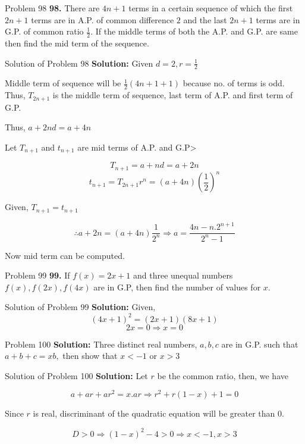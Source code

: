 \documentclass[aspectratio=1610,8pt]{beamer}
\begin{document}
\begin{frame}{Problem 98}
  \textbf{98.} There are $4n + 1$ terms in a certain sequence of which the first $2n + 1$ terms are in A.P. of common difference
  $2$ and the last $2n + 1$ terms are in G.P. of common ratio $\frac{1}{2}.$ If the middle terms of both the A.P. and G.P. are same
  then find the mid term of the sequence.
\end{frame}
\begin{frame}{Solution of Problem 98}
  \textbf{Solution:} Given $d = 2, r = \frac{1}{2}$

  Middle term of sequence will be $\frac{1}{2}(4n + 1 + 1)$ because no. of terms is odd. Thus, $T_{2n + 1}$ is the middle term of
  sequence, last term of A.P. and first term of G.P.

  Thus, $a + 2nd = a + 4n$

  Let $T_{n + 1}$ and $t_{n + 1}$ are mid terms of A.P. and G.P>

  $$T_{n + 1} = a + nd = a + 2n$$
  $$t_{n + 1} = T_{2n + 1}r^n = (a + 4n)\left(\frac{1}{2}\right)^n$$

  Given, $T_{n + 1} = t_{n + 1}$

  $$\therefore a + 2n = (a + 4n)\frac{1}{2^n} \Rightarrow a = \frac{4n - n.2^{n + 1}}{2^n - 1}$$

  Now mid term can be computed.
\end{frame}
\begin{frame}{Problem 99}
  \textbf{99.} If $f(x) = 2x + 1$ and three unequal numbers $f(x), f(2x), f(4x)$ are in G.P, then find the number of values for
  $x.$
\end{frame}
\begin{frame}{Solution of Problem 99}
  \textbf{Solution:} Given, $$(4x + 1)^2 = (2x + 1)(8x + 1)$$
  $$2x = 0 \Rightarrow x = 0$$
\end{frame}
\begin{frame}{Problem 100}
  \textbf{Solution:} Three distinct real numbers, $a, b, c$ are in G.P. such that $a + b + c = xb,$ then show that $x < -1$ or $x >
  3$
\end{frame}
\begin{frame}{Solution of Problem 100}
  \textbf{Solution:} Let $r$ be the common ratio, then, we have

  $$a + ar + ar^2 = x.ar \Rightarrow r^2 + r(1 - x) + 1 = 0$$

  Since $r$ is real, discriminant of the quadratic equation will be greater than $0.$

  $$D > 0 \Rightarrow (1 - x)^2 - 4> 0 \Rightarrow x < -1, x > 3$$
\end{frame}
\end{document}
